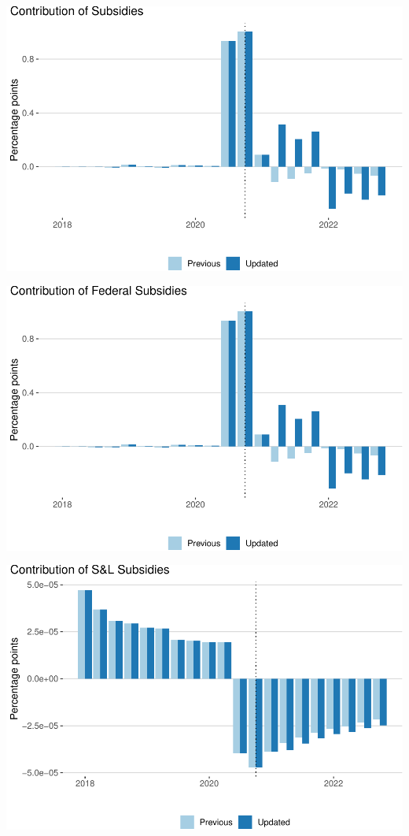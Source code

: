 \documentclass[
]{article}
\begin{document}
\begin{center}\includegraphics{compare-update_files/figure-latex/subsidies-1} \end{center}

\begin{center}\includegraphics{compare-update_files/figure-latex/subsidies_federal-1} \end{center}

\begin{center}\includegraphics{compare-update_files/figure-latex/subsidies_state-1} \end{center}
\end{document}
